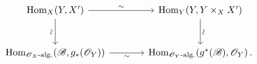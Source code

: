 \[
\begin{tikzcd}[column sep=large,row sep=large]
  \operatorname{Hom}_X(Y,X')
    \arrow[r,"\sim"]
    \arrow[d,"\rotatebox{90}{$\sim$}"']
  &
  \operatorname{Hom}_Y\!\left(Y,Y\times_X X'\right)
    \arrow[d,"\rotatebox{90}{$\sim$}"]
  \\
  \operatorname{Hom}_{\mathscr O_X\text{-}\mathrm{alg.}}
    \!\left(\mathscr B,g_*(\mathscr O_Y)\right)
    \arrow[r,"\sim"']
  &
  \operatorname{Hom}_{\mathscr O_Y\text{-}\mathrm{alg.}}
    \!\left(g^*(\mathscr B),\mathscr O_Y\right).
\end{tikzcd}
\]
